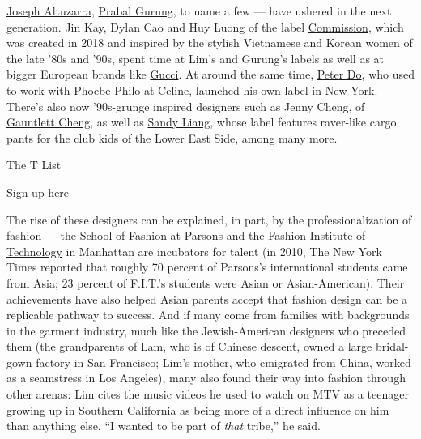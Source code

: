 \href{https://www.nytimes.com/2017/10/02/t-magazine/joseph-altuzarra-paris-fashion-week.html}{Joseph
Altuzarra},
\href{https://www.nytimes.com/2019/11/12/t-magazine/prabal-gurung-book-photos.html}{Prabal
Gurung}, to name a few --- have ushered in the next generation. Jin Kay,
Dylan Cao and Huy Luong of the label
\href{https://www.nytimes.com/2018/12/26/t-magazine/best-new-fashion-brands.html}{Commission},
which was created in 2018 and inspired by the stylish Vietnamese and
Korean women of the late '80s and '90s, spent time at Lim's and Gurung's
labels as well as at bigger European brands like
\href{https://www.nytimes.com/2018/10/15/t-magazine/alessandro-michele-gucci-interview.html}{Gucci}.
At around the same time, \href{https://peterdo.net/}{Peter Do}, who used
to work with
\href{https://www.nytimes.com/2018/03/01/t-magazine/fashion/celine-phoebe-philo-era-stories-sofia-coppola-stella-tennant.html}{Phoebe
Philo at Celine}, launched his own label in New York. There's also now
'90s-grunge inspired designers such as Jenny Cheng, of
\href{https://www.nytimes.com/2017/02/17/t-magazine/fashion/new-york-fashion-week-top-10-moments.html}{Gauntlett
Cheng}, as well as
\href{https://www.nytimes.com/2019/02/12/fashion/sandy-liang-fleece.html}{Sandy
Liang}, whose label features raver-like cargo pants for the club kids of
the Lower East Side, among many more.

The T List \textbar{}

Sign up here

The rise of these designers can be explained, in part, by the
professionalization of fashion --- the
\href{https://www.newschool.edu/parsons/fashion-school/}{School of
Fashion at Parsons} and the
\href{https://www.nytimes.com/topic/organization/fashion-institute-of-technology}{Fashion
Institute of Technology} in Manhattan are incubators for talent (in
2010, The New York Times reported that roughly 70 percent of Parsons's
international students came from Asia; 23 percent of F.I.T.'s students
were Asian or Asian-American). Their achievements have also helped Asian
parents accept that fashion design can be a replicable pathway to
success. And if many come from families with backgrounds in the garment
industry, much like the Jewish-American designers who preceded them (the
grandparents of Lam, who is of Chinese descent, owned a large
bridal-gown factory in San Francisco; Lim's mother, who emigrated from
China, worked as a seamstress in Los Angeles), many also found their way
into fashion through other arenas: Lim cites the music videos he used to
watch on MTV as a teenager growing up in Southern California as being
more of a direct influence on him than anything else. ``I wanted to be
part of \emph{that} tribe,'' he said.

